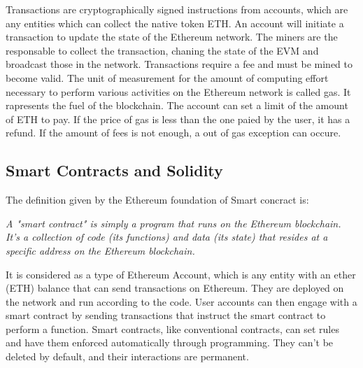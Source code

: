 \documentclass[a4paper,sigconf, language=french,
language=german, language=spanish, language=english]{acmart}
\begin{document}
Transactions are cryptographically signed instructions from accounts, which are any entities which can collect the native token ETH. An account will initiate a transaction to update the state of the Ethereum network. 
The miners are the responsable to collect the transaction, chaning the state of the EVM and broadcast those in the network. Transactions require a fee and must be mined to become valid. 
The unit of measurement for the amount of computing effort necessary to perform various activities on the Ethereum network is called gas. It rapresents the fuel of the blockchain. 
The account can set a limit of the amount of ETH to pay. If the price of gas is less than the one paied by the user, it has a refund. If the amount of fees is not enough, a out of gas exception can occure.
\subsection{Smart Contracts and Solidity}
The definition given by the Ethereum foundation of Smart concract is:

\textit{A "smart contract" is simply a program that runs on the Ethereum blockchain. It's a collection of code (its functions) and data (its state) that resides at a specific address on the Ethereum blockchain.}

It is considered as a type of Ethereum Account, which is any entity with an ether (ETH) balance that can send transactions on Ethereum. 
They are deployed on the network and run according to the code. User accounts can then engage with a smart contract by sending transactions that instruct the smart contract to perform a function. 
Smart contracts, like conventional contracts, can set rules and have them enforced automatically through programming.
They can't be deleted by default, and their interactions are permanent. 
\end{document}
